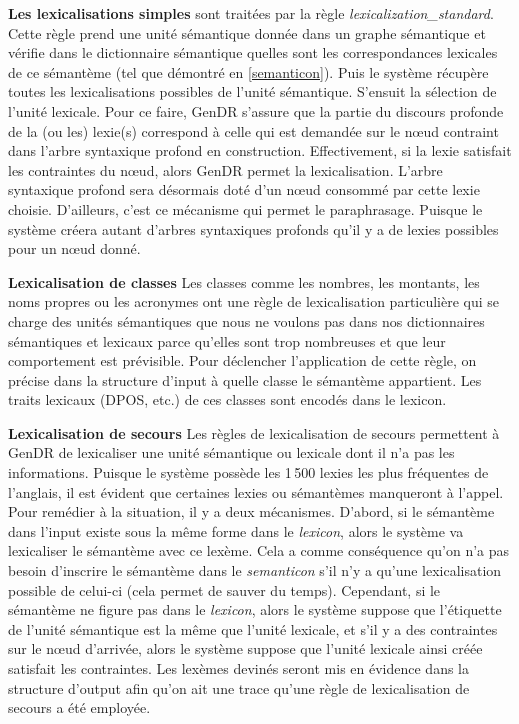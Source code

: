 \textbf{Les lexicalisations simples}
sont traitées par la règle \emph{lexicalization\_standard}. Cette règle prend une unité sémantique donnée dans un graphe sémantique et vérifie dans le dictionnaire sémantique quelles sont les correspondances lexicales de ce sémantème (tel que démontré en \ref{semanticon}). Puis le système récupère toutes les lexicalisations possibles de l'unité sémantique. S'ensuit la sélection de l'unité lexicale. Pour ce faire, GenDR s'assure que la partie du discours profonde de la (ou les) lexie(s) correspond à celle qui est demandée sur le n\oe{}ud contraint dans l'arbre syntaxique profond en construction. Effectivement, si la lexie satisfait les contraintes du n\oe{}ud, alors GenDR permet la lexicalisation. L'arbre syntaxique profond sera désormais doté d'un n\oe{}ud consommé par cette lexie choisie. D'ailleurs, c'est ce mécanisme qui permet le paraphrasage. Puisque le système créera autant d'arbres syntaxiques profonds qu'il y a de lexies possibles pour un n\oe{}ud donné. 

\textbf{Lexicalisation de classes}
Les classes comme les nombres, les montants, les noms propres ou les acronymes ont une règle de lexicalisation particulière qui se charge des unités sémantiques que nous ne voulons pas dans nos dictionnaires sémantiques et lexicaux parce qu'elles sont trop nombreuses et que leur comportement est prévisible. Pour déclencher l'application de cette règle, on précise dans la structure d'input à quelle classe le sémantème appartient. Les traits lexicaux (DPOS, etc.) de ces classes sont encodés dans le lexicon.

\textbf{Lexicalisation de secours}
Les règles de lexicalisation de secours permettent à GenDR de lexicaliser une unité sémantique ou lexicale dont il n'a pas les informations. Puisque le système possède les 1\,500 lexies les plus fréquentes de l'anglais, il est évident que certaines lexies ou sémantèmes manqueront à l'appel. Pour remédier à la situation, il y a deux mécanismes. D'abord, si le sémantème dans l'input existe sous la même forme dans le \emph{lexicon}, alors le système va lexicaliser le sémantème avec ce lexème. Cela a comme conséquence qu'on n'a pas besoin d'inscrire le sémantème dans le \emph{semanticon} s'il n'y a qu'une lexicalisation possible de celui-ci (cela permet de sauver du temps). Cependant, si le sémantème ne figure pas dans le \emph{lexicon}, alors le système suppose que l'étiquette de l'unité sémantique est la même que l'unité lexicale, et s'il y a des contraintes sur le n\oe{}ud d'arrivée, alors le système suppose que l'unité lexicale ainsi créée satisfait les contraintes. Les lexèmes devinés seront mis en évidence dans la structure d'output afin qu'on ait une trace qu'une règle de lexicalisation de secours a été employée.

